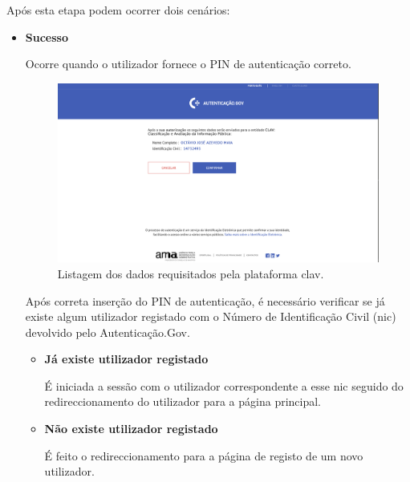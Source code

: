Após esta etapa podem ocorrer dois cenários:

\begin{itemize}
    \item \textbf{Sucesso}
    
    Ocorre quando o utilizador fornece o PIN de autenticação correto.
    
    \begin{figure}[H]
        \centering
        \includegraphics[width=\textwidth]{img/clav/authCC/authgov3.png}
        \caption{Listagem dos dados requisitados pela plataforma \gls{clav}.}
        \label{fig:listagemDadosCLAV}
    \end{figure}
    
    Após correta inserção do PIN de autenticação, é necessário verificar se já existe algum utilizador registado com o Número de Identificação Civil (\gls{nic}) devolvido pelo Autenticação.Gov.
    
    \begin{itemize}
        \item \textbf{Já existe utilizador registado}
        
        É iniciada a sessão com o utilizador correspondente a esse \gls{nic} seguido do redireccionamento do utilizador para a página principal.
            
        \item \textbf{Não existe utilizador registado}
        
        É feito o redireccionamento para a página de registo de um novo utilizador.
        

\end{itemize}
\end{itemize}
